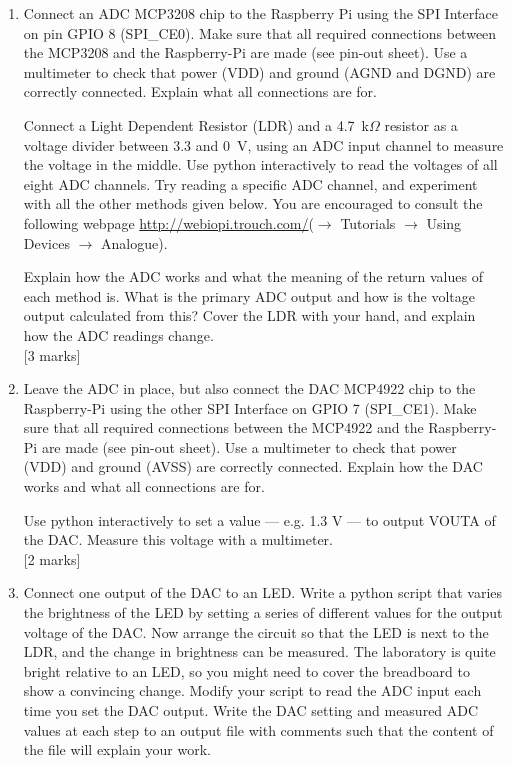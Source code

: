 \vspace*{-0.5cm}
\begin{enumerate}

\item [2.1.] Connect an ADC MCP3208 chip to the Raspberry Pi using the SPI Interface on pin GPIO 8 (SPI\_CE0).
Make sure that all required connections between the MCP3208 and the Raspberry-Pi are made (see pin-out sheet).
Use a multimeter to check that power (VDD) and ground (AGND and DGND) are correctly connected.
Explain what all connections are for.

Connect a Light Dependent Resistor (LDR) and a 4.7~k$\Omega$ resistor as a voltage divider between 3.3 and 0~V, using an ADC input channel to measure the voltage in the middle.
Use python interactively to read the voltages of all eight ADC channels.
Try reading a specific ADC channel, and experiment with all the other methods given below.
You are encouraged to consult the following webpage \url{http://webiopi.trouch.com/}($\rightarrow$ Tutorials $\rightarrow$ Using Devices $\rightarrow$ Analogue).

Explain how the ADC works and what the meaning of the return values of each method is.
What is the primary ADC output and how is the voltage output calculated from this?
Cover the LDR with your hand, and explain how the ADC readings change. \\


\vspace*{-0.5cm}
\hfill [3 marks]\\

\item [2.2.] Leave the ADC in place, but also connect the DAC MCP4922 chip to the Raspberry-Pi using the other SPI Interface on GPIO 7 (SPI\_CE1).
Make sure that all required connections between the MCP4922 and the Raspberry-Pi are made (see pin-out sheet).
Use a multimeter to check that power (VDD) and ground (AVSS) are correctly connected.
Explain how the DAC works and what all connections are for.

Use python interactively to set a value --- e.g. 1.3 V --- to output VOUTA of the DAC.
Measure this voltage with a multimeter. \\


\vspace*{-0.5cm}
\hfill [2 marks]\\

\item [2.3.] Connect one output of the DAC to an LED.
Write a python script that varies the brightness of the LED by setting a series of different values for the output voltage of the DAC.
Now arrange the circuit so that the LED is next to the LDR, and the change in brightness can be measured.
The laboratory is quite bright relative to an LED, so you might need to cover the breadboard to show a convincing change.
Modify your script to read the ADC input each time you set the DAC output.
Write the DAC setting and measured ADC values at each step to an output file with comments such that the content of the file will explain your work.



\end{enumerate}
